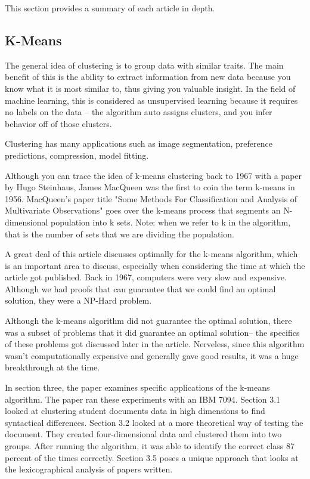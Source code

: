 \documentclass[12pt]{apa6}
\begin{document}
This section provides a summary of each article in depth.

\subsection{K-Means}


The general idea of clustering is to group data with similar traits. The main benefit of this is the ability to extract information from new data because you know what it is most similar to, thus giving you valuable insight. In the field of machine learning, this is considered as unsupervised learning because it requires no labels on the data -- the algorithm auto assigns clusters, and you infer behavior off of those clusters.

Clustering has many applications such as image segmentation, preference predictions, compression, model fitting.


Although you can trace the idea of k-means clustering back to 1967 with a paper by Hugo Steinhaus\cite{ogClustering}, James MacQueen was the first to coin the term k-means in 1956\cite{k-means}. MacQueen's paper title "Some Methods For Classification and Analysis of Multivariate Observations" goes over the k-means process that segments an N-dimensional population into k sets. Note: when we refer to k in the algorithm, that is the number of sets that we are dividing the population.


A great deal of this article discusses optimally for the k-means algorithm, which is an important area to discuss, especially when considering the time at which the article got published. Back in 1967, computers were very slow and expensive. Although we had proofs that can guarantee that we could find an optimal solution, they were a NP-Hard problem\cite{np-hard}. 

Although the k-means algorithm did not guarantee the optimal solution, there was a subset of problems that it did guarantee an optimal solution-- the specifics of these problems got discussed later in the article. Nerveless, since this algorithm wasn't computationally expensive and generally gave good results, it was a huge breakthrough at the time. 

In section three, the paper examines specific applications of the k-means algorithm. The paper ran these experiments with an IBM 7094. Section 3.1 looked at clustering student documents data in high dimensions to find syntactical differences. Section 3.2 looked at a more theoretical way of testing the document. They created four-dimensional data and clustered them into two groups. After running the algorithm, it was able to identify the correct class 87 percent of the times correctly. 
Section 3.5 poses a unique approach that looks at the lexicographical analysis of papers written. 
\end{document}
